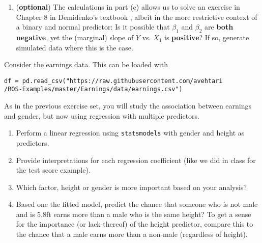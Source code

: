 \begin{exercise}
\begin{enumerate}[label=(\alph*)]
\item ({\bf optional}) The calculations in part (c) allows us to solve an exercise in Chapter 8 in Demidenko's textbook \cite{demidenko2019advanced}, albeit in the more restrictive  context of a binary and normal predictor: 
Is it possible that $\beta_1$ and $\beta_2$ are {\bf both negative}, yet the (marginal) slope of $Y$ vs. $X_1$ is {\bf positive}? If so, generate simulated data where this is the case. 
\end{enumerate}
\end{exercise}





\begin{exercise} Consider the earnings data. This can be loaded with 
\begin{Verbatim}
df = pd.read_csv("https://raw.githubusercontent.com/avehtari
/ROS-Examples/master/Earnings/data/earnings.csv")
\end{Verbatim}
As in the previous exercise set, you will study the association between earnings and gender, but now using regression with multiple predictors. 

\begin{enumerate}[label=(\alph*)]
\item Perform a linear regression using \verb!statsmodels! with gender and height as predictors. 
\item Provide interpretations for each regression coefficient (like we did in class for the test score example). 
\item Which factor, height or gender is more important based on your analysis? 
\item Based one the fitted model, predict the chance that someone who is not male and is 5.8ft earns more than a male who is the same height? To get a sense for the importance (or lack-thereof) of the height predictor, compare this to the chance that a male earns more than a non-male (regardless of height).
\end{enumerate}
\end{exercise}

